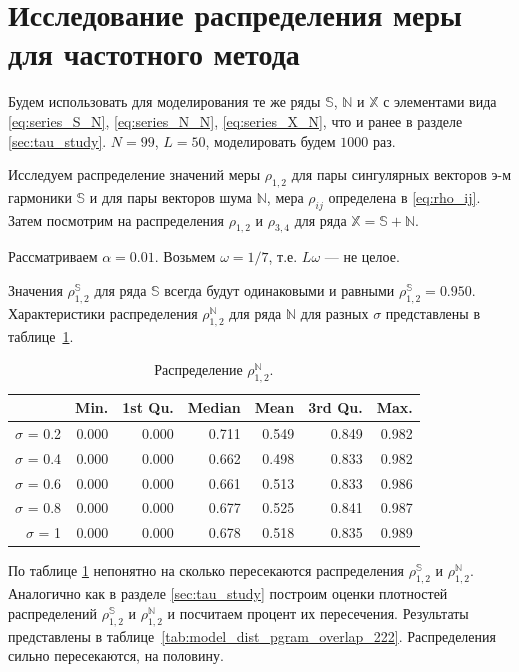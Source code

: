 \documentclass[specialist,
               substylefile = spbu.rtx,
               subf,href,colorlinks=true, 12pt]{disser}
\begin{document}
\section{Исследование распределения меры для частотного метода}
\label{sec:per_study}

Будем использовать для моделирования те же ряды $\mathbb{S}$, $\mathbb{N}$ и $\mathbb{X}$ с элементами вида
\eqref{eq:series_S_N}, \eqref{eq:series_N_N}, \eqref{eq:series_X_N}, что и ранее в разделе \ref{sec:tau_study}.
$N = 99$, $L = 50$, моделировать будем $1000$ раз.

Исследуем распределение значений  меры $\rho_{1,2}$ для пары сингулярных векторов э-м гармоники $\mathbb{S}$ и для пары векторов шума $\mathbb{N}$, мера $\rho_{ij}$ определена в \eqref{eq:rho_ij}. Затем посмотрим на распределения  $\rho_{1,2}$ и  $\rho_{3,4}$ для ряда $\mathbb{X} = \mathbb{S} + \mathbb{N}$.

Рассматриваем $\alpha = 0.01$. Возьмем $\omega = 1/7$, т.е. $L\omega$ --- не целое.

Значения $\rho^{\mathbb{S}}_{1,2}$  для ряда $\mathbb{S}$ всегда будут одинаковыми и равными  $\rho^{\mathbb{S}}_{1,2} = 0.950$. Характеристики распределения $\rho^{\mathbb{N}}_{1,2}$ для ряда $\mathbb{N}$ для разных $\sigma$ представлены в таблице~\ref{tab:model_dist_pgram_sig2}.

\begin{table}[hhh!]
\caption{Распределение $\rho^{\mathbb{N}}_{1,2}$.}
\centering
\begin{tabular}{rrrrrrr}
  \hline
 & Min. & 1st Qu. & Median & Mean & 3rd Qu. & Max. \\
  \hline
$\sigma$ = 0.2 & 0.000 & 0.000 & 0.711 & 0.549 & 0.849 & 0.982 \\ 
  $\sigma$ = 0.4 & 0.000 & 0.000 & 0.662 & 0.498 & 0.833 & 0.982 \\ 
  $\sigma$ = 0.6 & 0.000 & 0.000 & 0.661 & 0.513 & 0.833 & 0.986 \\ 
  $\sigma$ = 0.8 & 0.000 & 0.000 & 0.677 & 0.525 & 0.841 & 0.987 \\ 
  $\sigma$ = 1 & 0.000 & 0.000 & 0.678 & 0.518 & 0.835 & 0.989 \\ 
   \hline
\end{tabular}
\label{tab:model_dist_pgram_sig2}
\end{table}

По таблице \ref{tab:model_dist_pgram_sig2} непонятно на сколько пересекаются распределения $\rho^{\mathbb{S}}_{1,2}$ и $\rho^{\mathbb{N}}_{1,2}$.
Аналогично как в разделе \ref{sec:tau_study} построим оценки плотностей распределений $\rho^{\mathbb{S}}_{1,2}$ и  $\rho^{\mathbb{N}}_{1,2}$ и посчитаем процент их пересечения.
Результаты представлены в таблице~\ref{tab:model_dist_pgram_overlap_222}. Распределения сильно пересекаются, на половину.
\end{document}
